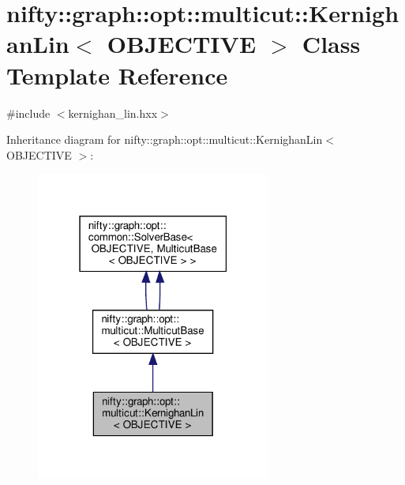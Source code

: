 \hypertarget{classnifty_1_1graph_1_1opt_1_1multicut_1_1KernighanLin}{}\section{nifty\+:\+:graph\+:\+:opt\+:\+:multicut\+:\+:Kernighan\+Lin$<$ O\+B\+J\+E\+C\+T\+I\+VE $>$ Class Template Reference}
\label{classnifty_1_1graph_1_1opt_1_1multicut_1_1KernighanLin}


{\ttfamily \#include $<$kernighan\+\_\+lin.\+hxx$>$}



Inheritance diagram for nifty\+:\+:graph\+:\+:opt\+:\+:multicut\+:\+:Kernighan\+Lin$<$ O\+B\+J\+E\+C\+T\+I\+VE $>$\+:
\nopagebreak
\begin{figure}[H]
\begin{center}
\leavevmode
\includegraphics[width=219pt]{classnifty_1_1graph_1_1opt_1_1multicut_1_1KernighanLin__inherit__graph}
\end{center}
\end{figure}


